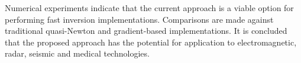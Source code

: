 \documentclass{report}
\begin{document}
Numerical experiments indicate that the current approach is a
viable option for performing fast inversion implementations.
Comparisons are made against traditional quasi-Newton and
gradient-based implementations. It is concluded that the proposed
approach has the potential for application to electromagnetic,
radar, seismic and medical technologies.
\end{document}
